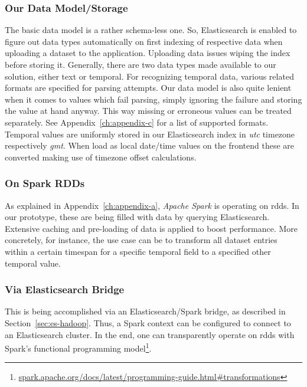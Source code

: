 \subsubsection{Our Data Model/Storage}

The basic data model is a rather schema-less one.
So, Elasticsearch is enabled to figure out data types automatically on first indexing of respective data when uploading a dataset to the application.
Uploading data issues wiping the index before storing it.
Generally, there are two data types made available to our solution, either text or temporal.
For recognizing temporal data, various related formats are specified for parsing attempts.
Our data model is also quite lenient when it comes to values which fail parsing, simply ignoring the failure and storing the value at hand anyway.
This way missing or erroneous values can be treated separately.
See Appendix~\ref{ch:appendix-c} for a list of supported formats.
Temporal values are uniformly stored in our Elasticsearch index in \emph{\gls{utc}} timezone respectively \emph{\gls{gmt}}.
When load as local date/time values on the frontend these are converted making use of timezone offset calculations.

\subsubsection{On Spark RDDs}

As explained in Appendix~\ref{ch:appendix-a}, \emph{Apache Spark} is operating on \gls{rdd}s.
In our prototype, these are being filled with data by querying Elasticsearch.
Extensive caching and pre-loading of data is applied to boost performance.
More concretely, for instance, the use case can be to transform all dataset entries within a certain timespan for a specific temporal field to a specified other temporal value.

\subsubsection{Via Elasticsearch Bridge}

This is being accomplished via an Elasticsearch/Spark bridge, as described in Section~\ref{sec:es-hadoop}.
Thus, a Spark context can be configured to connect to an Elasticsearch cluster.
In the end, one can transparently operate on \gls{rdd}s with Spark's functional programming model\footnote{\textcolor{blue}{\href{https://spark.apache.org/docs/latest/programming-guide.html\#transformations}{spark.apache.org/docs/latest/programming-guide.html\#transformations}}}.

